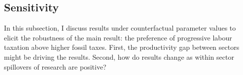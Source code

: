 
\subsection{Sensitivity}
In this subsection, I discuss results under counterfactual parameter values to elicit the robustness of the main result: the preference of progressive labour taxation above higher fossil taxes. 
First, the productivity gap between sectors might be driving the results. Second, how do results change as within sector spillovers of research are positive? 